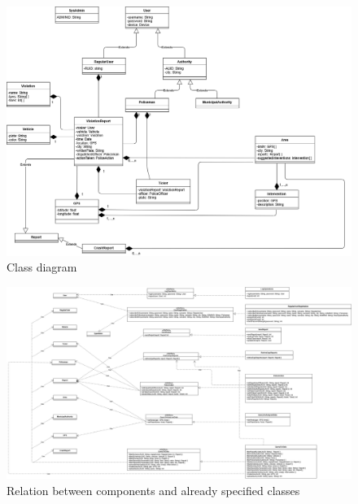 \begin{figure}[h!]
	\centering
	\includegraphics[angle=90, scale=0.40]{Images/ADV_class_diagram}
	\caption{Class diagram}
\end{figure}
\newpage

\begin{figure}[h!]
	\centering
	\includegraphics[angle=90, scale=0.25]{Images/component_class_relation}
	\caption{Relation between components and already specified classes}
\end{figure}
\newpage
